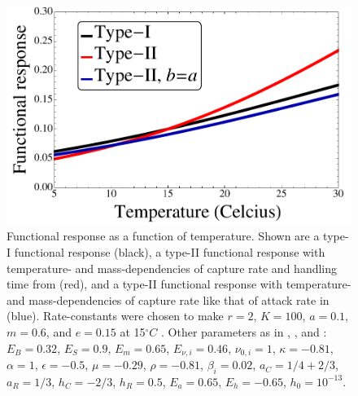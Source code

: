 \documentclass[11pt]{article}
\begin{document}
\begin{figure}[!ht]
\centering
\includegraphics[width=0.5\linewidth]{FunctionalResponseTemp}
\caption{
Functional response as a function of temperature.
Shown are a type-I functional response (black), a type-II functional response with temperature- and mass-dependencies of capture rate and handling time from \cite{Rall2012} (red), and a type-II functional response with temperature- and mass-dependencies of capture rate like that of attack rate in \cite{Gilbert2014} (blue).
Rate-constants were chosen to make $r = 2$, $K = 100$, $a = 0.1$, $m = 0.6$, and $e = 0.15$ at 15$^\circ C$ \citep[as in Figure 3 of][] {Gilbert2014}.
Other parameters as in \cite{Gilbert2014}, \cite{DeLong2015}, and \cite{Rall2012}: $E_B = 0.32$, $E_S = 0.9$, $E_m = 0.65$, $E_{\nu,i} = 0.46$, $\nu_{0,i} = 1$, $\kappa = -0.81$, $\alpha = 1$, $\epsilon = -0.5$, $\mu = -0.29$, $\rho = -0.81$, $\beta_i = 0.02$, $a_C = 1/4+2/3$, $a_R = 1/3$, $h_C = -2/3$, $h_R = 0.5$, $E_a = 0.65$, $E_h = -0.65$, $h_0 = 10^{-13}$.  
}
\label{FunctionalResponseTemp}
\end{figure}

\end{document}

